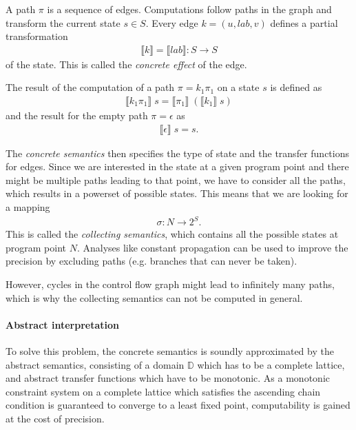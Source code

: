 A path $\pi$ is a sequence of edges.
Computations follow paths in the graph and transform the current state $s \in S$.
Every edge $k = (u, lab, v)$ defines a partial transformation
\begin{align}
\llbracket k \rrbracket = \llbracket lab \rrbracket : S \to S
\end{align}
of the state. This is called the \textit{concrete effect} of the edge.

The result of the computation of a path $\pi = k_1 \pi_1$ on a state $s$ is defined as
\begin{align}
\llbracket k_1 \pi_1 \rrbracket \; s = \llbracket \pi_1 \rrbracket \; (\llbracket k_1 \rrbracket \; s)
\end{align}
and the result for the empty path $\pi = \epsilon$ as
\begin{align}
\llbracket \epsilon \rrbracket \; s = s.
\end{align}

The \textit{concrete semantics} then specifies the type of state and the transfer functions for edges.
Since we are interested in the state at a given program point and there might be multiple paths leading to that point, we have to consider all the paths, which results in a powerset of possible states. This means that we are looking for a mapping
\begin{align}
\sigma : N \to 2^S.
\end{align}
This is called the \textit{collecting semantics}, which contains all the possible states at program point $N$.
Analyses like constant propagation can be used to improve the precision by excluding paths (e.g. branches that can never be taken).

However, cycles in the control flow graph might lead to infinitely many paths, which is why the collecting semantics can not be computed in general.

\paragraph*{Abstract interpretation}
To solve this problem, the concrete semantics is soundly approximated by the abstract semantics, consisting of a domain $\mathbb{D}$ which has to be a complete lattice, and abstract transfer functions which have to be monotonic. As a monotonic constraint system on a complete lattice which satisfies the ascending chain condition is guaranteed to converge to a least fixed point, computability is gained at the cost of precision.

